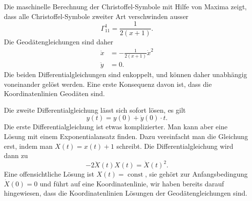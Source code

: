\begin{loesung}
\begin{teilaufgaben}
\item
Die maschinelle Berechnung der Christoffel-Symbole mit Hilfe von
Maxima zeigt, dass alle Christoffel-Symbole zweiter Art verschwinden
ausser
\[
\Gamma^{1}_{11}=\frac1{2(x+1)}.
\]
Die Geodätengleichungen sind daher
\begin{align*}
\ddot x&=-\frac1{2(x+1)}\dot x^2
\\
\ddot y&=0.
\end{align*}
Die beiden Differentialgleichungen sind enkoppelt, und können daher
unabhängig voneinander gelöst werden.
Eine erste Konsequenz davon ist, dass die Koordinatenlinien
Geodäten sind.

Die zweite Differentialgleichung lässt sich sofort lösen, es gilt
\[
y(t) = y(0) + \dot y(0)\cdot t.
\]
Die erste Differentialgleichung ist etwas komplizierter.
Man kann aber eine Lösung mit einem Exponentialansatz finden.
Dazu vereinfacht man die Gleichung erst, indem man $X(t)=x(t)+1$ schreibt.
Die Differentialgleichung wird dann zu
\begin{equation}
-2\ddot X(t) X(t) = \dot X(t)^2.
\label{uebung:0301:Dgl}
\end{equation}
Eine offensichtliche Lösung ist $X(t)=\operatorname{const}$, sie gehört
zur Anfangsbedingung $\dot X(0)=0$ und führt auf eine Koordinatenlinie,
wir haben bereits darauf hingewiesen, dass die Koordinatenlinien
Lösungen der Geodätengleichungen sind.


\end{teilaufgaben}
\end{loesung}
